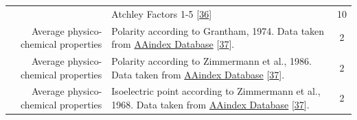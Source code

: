 \documentclass[12pt,a4paper,twoside]{book}
\theoremstyle{definition}
\theoremstyle{definition}
\theoremstyle{remark}
\begin{document}
\begin{longtable}[]{@{}rlc@{}}
\begin{minipage}[t]{0.23\columnwidth}
\end{minipage} & \begin{minipage}[t]{0.50\columnwidth}\raggedright\strut
Atchley Factors 1-5 {[}\protect\hyperlink{ref-Atchley2005}{36}{]}\strut
\end{minipage} & \begin{minipage}[t]{0.18\columnwidth}\centering\strut
10\strut
\end{minipage}\tabularnewline
\begin{minipage}[t]{0.23\columnwidth}\raggedleft\strut
Average physico-chemical properties\strut
\end{minipage} & \begin{minipage}[t]{0.50\columnwidth}\raggedright\strut
Polarity according to Grantham, 1974. Data taken from
\href{http://www.genome.jp/dbget-bin/www_bget?aaindex:GRAR740102}{AAindex
Database} {[}\protect\hyperlink{ref-Kawashima2008}{37}{]}.\strut
\end{minipage} & \begin{minipage}[t]{0.18\columnwidth}\centering\strut
2\strut
\end{minipage}\tabularnewline
\begin{minipage}[t]{0.23\columnwidth}\raggedleft\strut
Average physico-chemical properties\strut
\end{minipage} & \begin{minipage}[t]{0.50\columnwidth}\raggedright\strut
Polarity according to Zimmermann et al., 1986. Data taken from
\href{http://www.genome.jp/dbget-bin/www_bget?aaindex:ZIMJ680103}{AAindex
Database} {[}\protect\hyperlink{ref-Kawashima2008}{37}{]}.\strut
\end{minipage} & \begin{minipage}[t]{0.18\columnwidth}\centering\strut
2\strut
\end{minipage}\tabularnewline
\begin{minipage}[t]{0.23\columnwidth}\raggedleft\strut
Average physico-chemical properties\strut
\end{minipage} & \begin{minipage}[t]{0.50\columnwidth}\raggedright\strut
Isoelectric point according to Zimmermann et al., 1968. Data taken from
\href{http://www.genome.jp/dbget-bin/www_bget?aaindex:ZIMJ680104}{AAindex
Database} {[}\protect\hyperlink{ref-Kawashima2008}{37}{]}.\strut
\end{minipage} & \begin{minipage}[t]{0.18\columnwidth}\centering\strut
2\strut
\end{minipage}\tabularnewline

\end{longtable}
\end{document}
